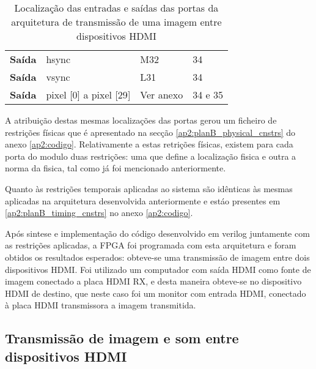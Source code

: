 \begin{table}[h!]
\begin{tabular}{rlll}
			\multicolumn{1}{r|}{\textbf{Saída}}   & hsync                                 & M32                                      & 34                                         \\
			\multicolumn{1}{r|}{\textbf{Saída}}   & vsync                                 & L31                                      & 34                                         \\
			\multicolumn{1}{r|}{\textbf{Saída}}   & pixel {[}0{]} a pixel {[}29{]}        & Ver anexo                                & 34 e 35                                    \\ \hline
		\end{tabular}%
	\captionsetup{width=0.80\linewidth}
	\caption{Localização das entradas e saídas das portas da arquitetura de transmissão de uma imagem entre dispositivos HDMI}
	\label{table:LOCplanB_simples}
\end{table}



A atribuição destas mesmas localizações das portas gerou um ficheiro de restrições físicas que é apresentado na secção \ref{ap2:planB_physical_cnstrs} do anexo \ref{ap2:codigo}. Relativamente a estas retrições físicas, existem para cada porta do modulo duas restrições: uma que define a localização fisica e outra a norma da fisica, tal como já foi mencionado anteriormente. 

Quanto às restrições temporais aplicadas ao sistema são idênticas às mesmas aplicadas na arquitetura desenvolvida anteriormente e estáo presentes em \ref{ap2:planB_timing_cnstrs} no anexo \ref{ap2:codigo}.

Após sintese e implementação do código desenvolvido em verilog juntamente com as restrições aplicadas, a FPGA foi programada com esta arquitetura e foram obtidos os resultados esperados: obteve-se uma transmissão de imagem entre dois dispositivos HDMI. Foi utilizado um computador com saída HDMI como fonte de imagem conectado a placa HDMI RX, e desta maneira obteve-se no dispositivo HDMI de destino, que neste caso foi um monitor com entrada HDMI, conectado à placa HDMI transmissora a imagem transmitida.


\subsection{Transmissão de imagem e som entre dispositivos HDMI}

